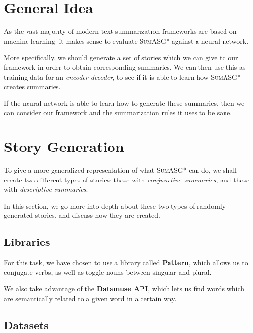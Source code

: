 \label{chapter:evaluation}

\section{General Idea}

As the vast majority of modern text summarization frameworks are based on machine learning, it makes sense to evaluate \textsc{SumASG*} against a neural network.

More specifically, we should generate a set of stories which we can give to our framework in order to obtain corresponding summaries. We can then use this as training data for an \textit{encoder-decoder}, to see if it is able to learn how \textsc{SumASG*} creates summaries.

If the neural network is able to learn how to generate these summaries, then we can consider our framework and the summarization rules it uses to be sane.

\section{Story Generation}

To give a more generalized representation of what \textsc{SumASG*} can do, we shall create two different types of stories: those with \textit{conjunctive summaries}, and those with \textit{descriptive summaries}.

In this section, we go more into depth about these two types of randomly-generated stories, and discuss how they are created.

\subsection{Libraries}

For this task, we have chosen to use a library called \textbf{\href{http://web.archive.org/web/20190516161631/https://www.clips.uantwerpen.be/pages/pattern-en}{Pattern}}, which allows us to conjugate verbs, as well as toggle nouns between singular and plural.

We also take advantage of the \textbf{\href{https://www.datamuse.com/api/}{Datamuse API}}, which lets us find words which are semantically related to a given word in a certain way.

\subsection{Datasets}


